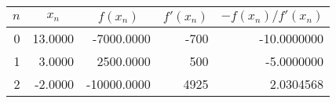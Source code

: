 {
\begin{center}
\begin{tabular}{r|r|r|r|r}
 \multicolumn{1}{c|}{$n$}&  \multicolumn{1}{c|}{$x_n$}&  \multicolumn{1}{c|}{$f(x_n)$}&  \multicolumn{1}{c|}{$f'(x_n)$}&  \multicolumn{1}{c}{$-f(x_n)/f'(x_n)$}\\\hline
0 &  13.0000   &  -7000.0000 &  -700 & -10.0000000 \\
1 &   3.0000   &   2500.0000 &   500 &  -5.0000000 \\
2 &  -2.0000   & -10000.0000 &  4925 &   2.0304568 
\end{tabular}
\end{center}
}

